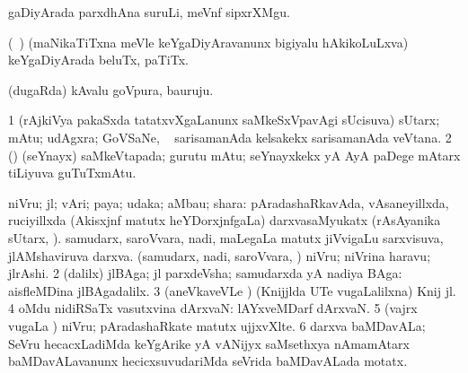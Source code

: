 {\bentry
{} 
\gl{\nA}
\expl{}
\bmng
gaDiyArada parxdhAna suruLi, meVnf sipxrXMgu. 
\emng
\eentry

\bentry
{} 
\gl{\nA}
\expl{}
\bmng
(\kanmu\ \birx) (maNikaTiTxna meVle keYgaDiyAravanunx bigiyalu hAkikoLuLxva) keYgaDiyArada beluTx, paTiTx. 
\emng
\eentry

\bentry
{} 
\gl{\nA}
\expl{}
\bmng
(dugaRda) kAvalu goVpura, bauruju. 
\emng
\eentry

\bentry
{} 
\gl{\nA}
\expl{}
\bmng
\bnum
\num{1} (rAjkiVya pakaSxda tatatxvXgaLanunx saMkeSxVpavAgi sUcisuva) sUtarx; mAtu; udAgxra; GoVSaNe, \udA\  sarisamanAda kelsakekx sarisamanAda veVtana. 
\num{2} (\ca) (seYnayx) saMkeVtapada; gurutu mAtu; seYnayxkekx yA AyA paDege mAtarx tiLiyuva guTuTxmAtu. 
\enum
\emng
\eentry

\bentry
{} 
\gl{\nA}
\expl{}
\bmng
\bnum
{} niVru; jl; vAri; paya; udaka; aMbau; shara: 
\banum
{} pAradashaRkavAda, vAsaneyillxda, ruciyillxda (Akisxjnf matutx heYDorxjnfgaLa) darxvasaMyukatx (rAsAyanika sUtarx, ). 
 samudarx, saroVvara, nadi, maLegaLa matutx jiVvigaLu sarxvisuva, jlAMshaviruva darxva. 
 (samudarx, nadi, saroVvara, \mo) niVru; niVrina haravu; jlrAshi. 
\eanum
\numie
\num{2} (\bava dalilx) jlBAga; jl parxdeVsha; samudarxda yA nadiya BAga:  aisfleMDina jlBAgadalilx. 
\num{3} (aneVkaveVLe ) (Knijjlda UTe \mo vugaLalilxna) Knij jl. 
\num{4} oMdu nidiRSaTx vasutxvina dArxvaN:  lAYxveMDarf dArxvaN. 
\num{5} (vajrx \mo vugaLa \vi) niVru; pAradashaRkate matutx ujjxvXlte. 
\num{6} darxva baMDavALa; SeVru hecacxLadiMda keYgArike yA vANijyx saMsethxya nAmamAtarx baMDavALavanunx hecicxsuvudariMda seVrida baMDavALada motatx. 
\enum
\emng

}
